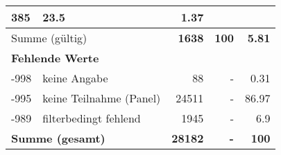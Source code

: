 \begin{longtable}{lXrrr}
       \num{385} &
       \num[round-mode=places,round-precision=2]{23.5} &
         \num[round-mode=places,round-precision=2]{1.37} \\
     \midrule
     \multicolumn{2}{l}{Summe (gültig)} &
       \textbf{\num{1638}} &
     \textbf{100} &
       \textbf{\num[round-mode=places,round-precision=2]{5.81}} \\
     \multicolumn{5}{l}{\textbf{Fehlende Werte}}\\
       -998 &
       keine Angabe &
         \num{88} &
        - &
         \num[round-mode=places,round-precision=2]{0.31} \\
       -995 &
       keine Teilnahme (Panel) &
         \num{24511} &
        - &
         \num[round-mode=places,round-precision=2]{86.97} \\
       -989 &
       filterbedingt fehlend &
         \num{1945} &
        - &
         \num[round-mode=places,round-precision=2]{6.9} \\
     \midrule
     \multicolumn{2}{l}{\textbf{Summe (gesamt)}} &
          \textbf{\num{28182}} &
        \textbf{-} &
        \textbf{100} \\
     \bottomrule
     \end{longtable}
     
